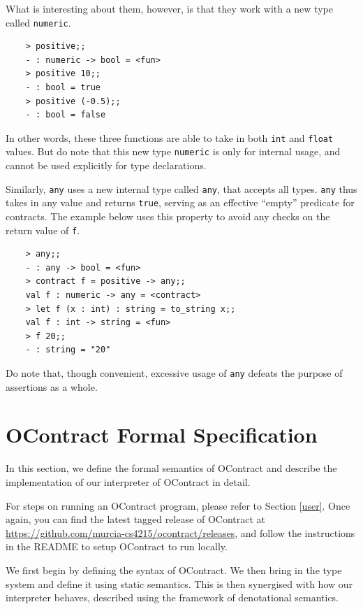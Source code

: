 \documentclass[a4paper]{article}
\begin{document}
What is interesting about them, however, is that they work with a new type called \texttt{numeric}.

\begin{verbatim}
    > positive;;
    - : numeric -> bool = <fun>
    > positive 10;;
    - : bool = true
    > positive (-0.5);;
    - : bool = false
\end{verbatim}

In other words, these three functions are able to take in both \texttt{int} and \texttt{float} values.
But do note that this new type \texttt{numeric} is only for internal usage, and cannot be used explicitly for type declarations.

Similarly, \texttt{any} uses a new internal type called \texttt{any}, that accepts all types.
\texttt{any} thus takes in any value and returns \texttt{true}, serving as an effective ``empty'' predicate for contracts.
The example below uses this property to avoid any checks on the return value of \texttt{f}.

\begin{verbatim}
    > any;;
    - : any -> bool = <fun>
    > contract f = positive -> any;;
    val f : numeric -> any = <contract>
    > let f (x : int) : string = to_string x;;
    val f : int -> string = <fun>
    > f 20;;
    - : string = "20"
\end{verbatim}

Do note that, though convenient, excessive usage of \texttt{any} defeats the purpose of assertions as a whole.

\section{OContract Formal Specification}
\label{developer}

In this section, we define the formal semantics of OContract and describe the implementation of our interpreter of OContract in detail.

For steps on running an OContract program, please refer to Section \ref{user}.
Once again, you can find the latest tagged release of OContract at \url{https://github.com/murcia-cs4215/ocontract/releases}, and follow the instructions in the README to setup OContract to run locally.

We first begin by defining the syntax of OContract.
We then bring in the type system and define it using static semantics.
This is then synergised with how our interpreter behaves, described using the framework of denotational semantics.
\end{document}
